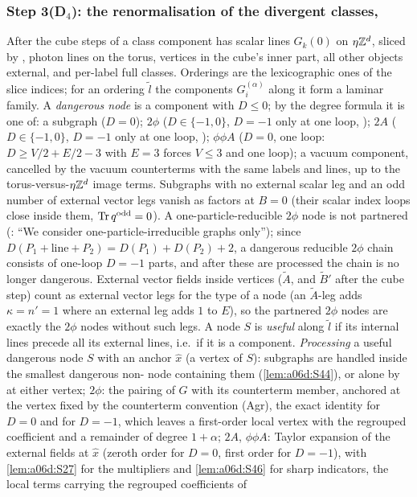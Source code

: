 
\subsubsection*{Step 3(D$_4$): the renormalisation of the divergent classes, \cite[pp.~434--445]{Ba3}}

After the cube steps of \cite[p.~433]{Ba3} a class component has scalar lines $G_k(0)$ on $\eta\mathbb Z^d$, sliced by \cite[(2.6)]{Ba3}, photon lines on the torus, vertices in the cube's inner part, all other objects external, and per-label full classes. Orderings are the lexicographic ones of the slice indices; for an ordering $\tilde l$ the components $G^{(\alpha)}_i$ along it form a laminar family. A \emph{dangerous node} is a component with $D\le0$; by the degree formula \cite[(2.1)--(2.3)]{Ba3} it is one of: a \cite[(2.4)]{Ba3} subgraph ($D=0$); $2\phi$ ($D\in\{-1,0\}$, $D=-1$ only at one loop, \cite[(3.6), (3.8)]{Ba3}); $2A$ ($D\in\{-1,0\}$, $D=-1$ only at one loop, \cite[(3.25)]{Ba3}); $\phi\phi A$ ($D=0$, one loop: $D\ge V/2+E/2-3$ with $E=3$ forces $V\le3$ and one loop); a vacuum component, cancelled by the vacuum counterterms \cite[(1.24)]{Ba3} with the same labels and lines, up to the torus-versus-$\eta\mathbb Z^d$ image terms. Subgraphs with no external scalar leg and an odd number of external vector legs vanish as factors at $B=0$ (their scalar index loops close inside them, $\operatorname{Tr} q^{\mathrm{odd}}=0$). A one-particle-reducible $2\phi$ node is not partnered (\cite[p.~430]{Ba3}: ``We consider one-particle-irreducible graphs only''); since $D(P_1+\text{line}+P_2)=D(P_1)+D(P_2)+2$, a dangerous reducible $2\phi$ chain consists of one-loop $D=-1$ parts, and after these are processed the chain is no longer dangerous. External vector fields inside vertices ($\tilde A$, and $\tilde B'$ after the cube step) count as external vector legs for the type of a node (an $\tilde A$-leg adds $\kappa=n'=1$ where an external leg adds $1$ to $E$), so the partnered $2\phi$ nodes are exactly the $2\phi$ nodes without such legs. A node $S$ is \emph{useful} along $\tilde l$ if its internal lines precede all its external lines, i.e.\ if it is a component. \emph{Processing} a useful dangerous node $S$ with an anchor $\hat x$ (a vertex of $S$): \cite[(2.4)]{Ba3} subgraphs are handled inside the smallest dangerous non-\cite[(2.4)]{Ba3} node containing them (\cref{lem:a06d:S44}), or alone by \cite[(2.8)]{Ba3} at either vertex; $2\phi$: the pairing of $G$ with its counterterm member, anchored at the vertex fixed by the counterterm convention (Agr), the exact identity \cite[(3.19)]{Ba3} for $D=0$ and \cite[(3.11)]{Ba3} for $D=-1$, which leaves a first-order local vertex with the regrouped coefficient and a remainder of degree $1+\alpha$; $2A$, $\phi\phi A$: Taylor expansion of the external fields at $\hat x$ (zeroth order for $D=0$, first order for $D=-1$), with \cref{lem:a06d:S27} for the multipliers and \cref{lem:a06d:S46} for sharp indicators, the local terms carrying the regrouped coefficients of 